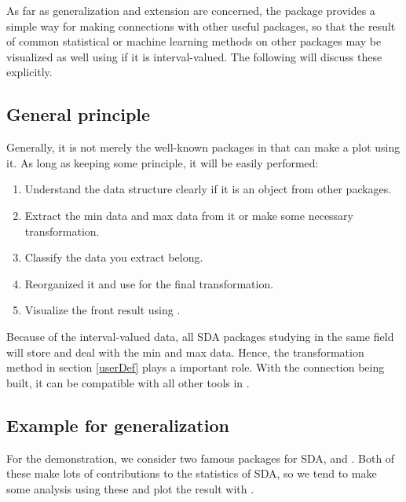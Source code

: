 \documentclass[article]{jss}
\begin{document}
As far as generalization and extension are concerned, the package provides a simple way for making connections with other useful packages, so that the result of common statistical or machine learning methods on other packages may be visualized as well using  if it is interval-valued. The following will discuss these explicitly. 

\subsection{General principle}\label{genPrin}

Generally, it is not merely the well-known packages in  that can make a plot using it. As long as keeping some principle, it will be easily performed:

\begin{enumerate}
  \item Understand the data structure clearly if it is an object from other packages.
  \item Extract the min data and max data from it or make some necessary transformation.
  \item Classify the data you extract belong.
  \item Reorganized it and use  for the final transformation.
  \item Visualize the front result using .
\end{enumerate}

Because of the interval-valued data, all SDA packages studying in the same field will store and deal with the min and max data. Hence, the transformation method in section \ref{userDef} plays a important role.
With the connection being built, it can be compatible with all other tools in .


\subsection{Example for generalization}

For the demonstration, we consider two famous  packages for SDA,  \cite{irpino2015} and  \cite{Silva2011}. Both of these make lots of contributions to the statistics of SDA, so we tend to make some analysis using these and plot the result with .

\subsubsection[HistDAWass]{}
\end{document}
